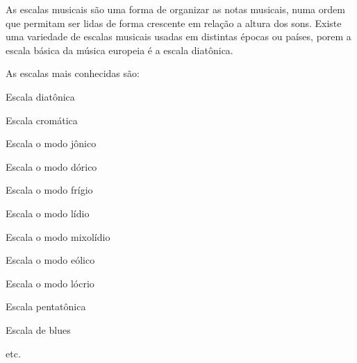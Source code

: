 \label{sec:pos:Escala}
As escalas musicais são uma forma de organizar as notas musicais, 
numa ordem que permitam ser lidas de forma crescente em relação a altura dos sons.
Existe uma variedade de escalas musicais usadas em distintas épocas ou países, 
porem a escala básica da música europeia é a escala diatônica. \cite[pp. 753]{apel1969harvard}
\begin{example}As escalas mais conhecidas são:
\begin{inparaitem}
\item Escala diatônica
\item Escala cromática
\item Escala o modo jônico
\item Escala o modo dórico
\item Escala o modo frígio
\item Escala o modo lídio
\item Escala o modo mixolídio
\item Escala o modo eólico
\item Escala o modo lócrio
\item Escala pentatônica
\item Escala de blues
\item etc.
\end{inparaitem}
\end{example}

